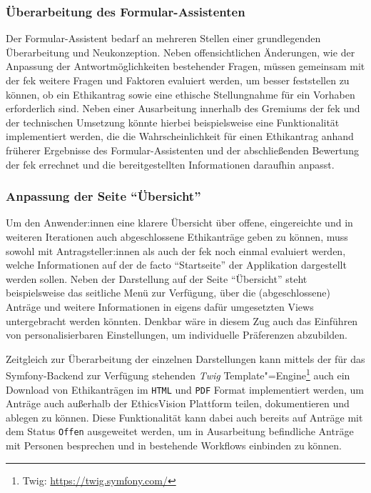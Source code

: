 \documentclass[a4paper,12pt,twoside]{scrreprt}
\begin{document}
\subsubsection*{Überarbeitung des Formular-Assistenten}
\label{sub-sub-sec:überarbeitung-formular-assistent}

Der Formular-Assistent bedarf an mehreren Stellen einer grundlegenden Überarbeitung und Neukonzeption. Neben offensichtlichen Änderungen, wie der Anpassung der Antwortmöglichkeiten bestehender Fragen, müssen gemeinsam mit der \ac{fek} weitere Fragen und Faktoren evaluiert werden, um besser feststellen zu können, ob ein Ethikantrag sowie eine ethische Stellungnahme für ein Vorhaben erforderlich sind. Neben einer Ausarbeitung innerhalb des Gremiums der \ac{fek} und der technischen Umsetzung könnte hierbei beispielsweise eine Funktionalität implementiert werden, die die Wahrscheinlichkeit für einen Ethikantrag anhand früherer Ergebnisse des Formular-Assistenten und der abschließenden Bewertung der \ac{fek} errechnet und die bereitgestellten Informationen daraufhin anpasst.

\subsubsection*{Anpassung der Seite \enquote{Übersicht}}
\label{sub-sub-sec:anpassung-seite-übersicht}

Um den Anwender:innen eine klarere Übersicht über offene, eingereichte und in weiteren Iterationen auch abgeschlossene Ethikanträge geben zu können, muss sowohl mit Antragsteller:innen als auch der \ac{fek} noch einmal evaluiert werden, welche Informationen auf der de facto \enquote{Startseite} der Applikation dargestellt werden sollen. Neben der Darstellung auf der Seite \enquote{Übersicht} steht beispielsweise das seitliche Menü zur Verfügung, über die (abgeschlossene) Anträge und weitere Informationen in eigens dafür umgesetzten Views untergebracht werden könnten. Denkbar wäre in diesem Zug auch das Einführen von personalisierbaren Einstellungen, um individuelle Präferenzen abzubilden.

\medskip

Zeitgleich zur Überarbeitung der einzelnen Darstellungen kann mittels der für das Symfony-Backend zur Verfügung stehenden \textit{Twig} Template"=Engine\footnote{Twig: \url{https://twig.symfony.com/}} auch ein Download von Ethikanträgen im \texttt{HTML} und \texttt{PDF} Format implementiert werden, um Anträge auch außerhalb der EthicsVision Plattform teilen, dokumentieren und ablegen zu können. Diese Funktionalität kann dabei auch bereits auf Anträge mit dem Status \texttt{Offen} ausgeweitet werden, um in Ausarbeitung befindliche Anträge mit Personen besprechen und in bestehende Workflows einbinden zu können.
\end{document}
